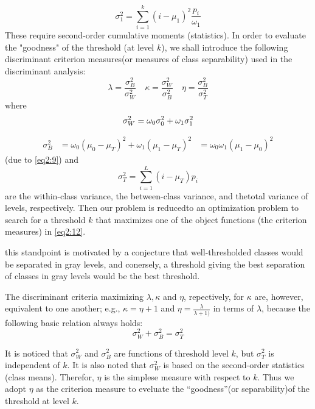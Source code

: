 \begin{equation}
  \label{eq2:11}
  \sigma_1^2=\sum_{i=1}^k(i-\mu_1)^2\frac{p_i}{\omega_1}
\end{equation}
These require second-order cumulative moments (statistics). In order to evaluate the "goodness" of the threshold (at level $k$), we shall introduce the following discriminant criterion measures(or measures of class separability) used in the discriminant analysis:
\begin{equation}
  \label{eq2:12}
  \lambda=\frac{\sigma_B^2}{\sigma_W^2}\quad
  \kappa=\frac{\sigma_W^2}{\sigma_B^2}\quad
  \eta=\frac{\sigma_B^2}{\sigma_T^2}
\end{equation}
where
\begin{equation}
  \label{eq2:13}
  \sigma_W^2 = \omega_0\sigma_0^2+\omega_1\sigma_1^2\\
\end{equation}

\begin{equation}
  \label{eq2:14}
  \begin{aligned}
    \sigma_B^2 &= \omega_0(\mu_0-\mu_T)^2+\omega_1(\mu_1-\mu_T)^2
    &= \omega_0\omega_1(\mu_1-\mu_0)^2
  \end{aligned}
\end{equation}
(due to \eqref{eq2:9}) and
\begin{equation}
  \label{eq2:15}
  \sigma_T^2=\sum_{i=1}^L(i-\mu_T)p_i
\end{equation}
are the within-class variance, the between-class variance, and thetotal variance of levels, respectively. Then our problem is reducedto an optimization problem to search for a threshold $k$ that maximizes one of the object functions (the criterion measures) in \eqref{eq2:12}.

this standpoint is motivated by a conjecture that well-thresholded classes would be separated in gray levels, and conersely, a threshold giving the best separation of classes in gray levels would be the best threshold.

The discriminant criteria maximizing $\lambda,\kappa$ and $\eta$, repectively, for $\kappa$ are, however, equivalent to one another; e.g., $\kappa=\eta+1$ and $\eta=\frac{\lambda}{\lambda+1)}$ in terms of $\lambda$, because the following basic relation always holds:
\begin{equation}
  \label{eq2:16}
  \sigma_W^2+\sigma_B^2=\sigma_T^2
\end{equation}

It is noticed that $\sigma_W^2$ and $\sigma_B^2$ are functions of threshold level $k$, but $\sigma_T^2$ is independent of $k$. It is also noted that $\sigma_W^2$ is based on the second-order statistics (class means). Therefor, $\eta$ is the simplese measure with respect to $k$. Thus we adopt $\eta$ as the criterion measure to eveluate the ``goodness''(or separability)of the threshold at level $k$.

